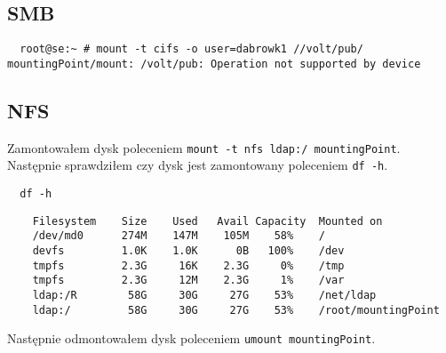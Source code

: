 \documentclass{article} %
\begin{document}
\subsection{SMB}
\begin{verbatim}
  root@se:~ # mount -t cifs -o user=dabrowk1 //volt/pub/ mountingPoint/mount: /volt/pub: Operation not supported by device 
\end{verbatim}

\subsection{NFS}
Zamontowałem dysk poleceniem \texttt{mount -t nfs ldap:/ mountingPoint}. Następnie sprawdziłem czy dysk jest zamontowany poleceniem \texttt{df -h}.

\begin{tcolorbox}[colback=yellow!10!white,colframe=red!45!black,coltitle=yellow!100!black, title=FreeBSD]
  \begin{lstlisting}
  df -h
  \end{lstlisting}
  \tcblower
  \tiny
  \begin{lstlisting}
    Filesystem    Size    Used   Avail Capacity  Mounted on
    /dev/md0      274M    147M    105M    58%    /
    devfs         1.0K    1.0K      0B   100%    /dev
    tmpfs         2.3G     16K    2.3G     0%    /tmp
    tmpfs         2.3G     12M    2.3G     1%    /var
    ldap:/R        58G     30G     27G    53%    /net/ldap
    ldap:/         58G     30G     27G    53%    /root/mountingPoint 
  \end{lstlisting}
\end{tcolorbox}
\normalsize

Następnie odmontowałem dysk poleceniem \texttt{umount mountingPoint}.
\end{document}
